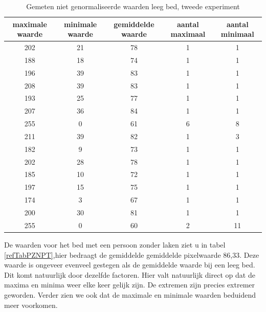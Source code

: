 \begin{table}[h]
	\begin{tabular}{|c|c|c|c|c|}
		\hline
		maximale waarde & minimale waarde & gemiddelde waarde & aantal maximaal & aantal minimaal\\ \hline
		202 & 21 & 78 & 1 & 1\\ \hline
		188 & 18 & 74 & 1 & 1\\ \hline
		196 & 39 & 83 & 1 & 1 \\ \hline
		208 & 39 & 83 & 1 & 1 \\ \hline
		193 & 25 & 77 & 1 & 1 \\ \hline
		207 & 36 & 84 & 1 & 1 \\ \hline
		255 & 0  & 61 & 6 & 8 \\ \hline
		211 & 39 & 82 & 1 & 3 \\ \hline
		182 & 9  & 73 & 1 & 1 \\ \hline
		202 & 28 & 78 & 1 & 1 \\ \hline
		185 & 10 & 72 & 1 & 1 \\ \hline
		197 & 15 & 75 & 1 & 1 \\ \hline
		174 & 3  & 67 & 1 & 1 \\ \hline
		200 & 30 & 81 & 1 & 1 \\ \hline
		255 & 0  & 60 & 2 & 11\\ \hline
	\end{tabular}
	\caption{Gemeten niet genormaliseerde waarden leeg bed, tweede experiment}
	\label{refTabPZNLT}
\end{table}
De waarden voor het bed met een persoon zonder laken ziet u in tabel \ref{refTabPZNPT},hier bedraagt de gemiddelde gemiddelde pixelwaarde 86,33. Deze waarde is ongeveer evenveel gestegen als de gemiddelde waarde bij een leeg bed. Dit komt natuurlijk door dezelfde factoren. Hier valt natuurlijk direct op dat de maxima en minima weer elke keer gelijk zijn. De extremen zijn precies extremer geworden. Verder zien we ook dat de maximale en minimale waarden beduidend meer voorkomen. \\
